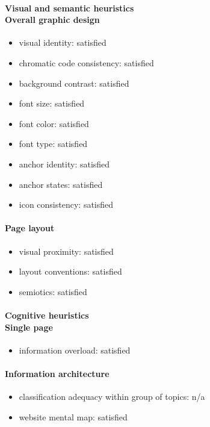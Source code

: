 \begin{enumerate}
	\paragraph*{Visual and semantic heuristics \\ Overall graphic design }
	\begin{itemize}
		\item visual identity: satisfied
		\item chromatic code consistency: satisfied
		\item background contrast: satisfied
		\item font size: satisfied
		\item font color: satisfied
		\item font type: satisfied
		\item anchor identity: satisfied
		\item anchor states: satisfied
		\item icon consistency: satisfied
	\end{itemize}

	\paragraph*{Page layout}
	\begin{itemize}
		\item visual proximity: satisfied
		\item layout conventions: satisfied
		\item semiotics: satisfied
	\end{itemize}

	\paragraph*{Cognitive heuristics \\ Single page}
	\begin{itemize}
		\item information overload: satisfied
	\end{itemize}	

	\paragraph*{Information architecture}
	\begin{itemize}
		\item classification adequacy within group of topics: n/a
		\item website mental map: satisfied
	\end{itemize}
	\end{enumerate}
